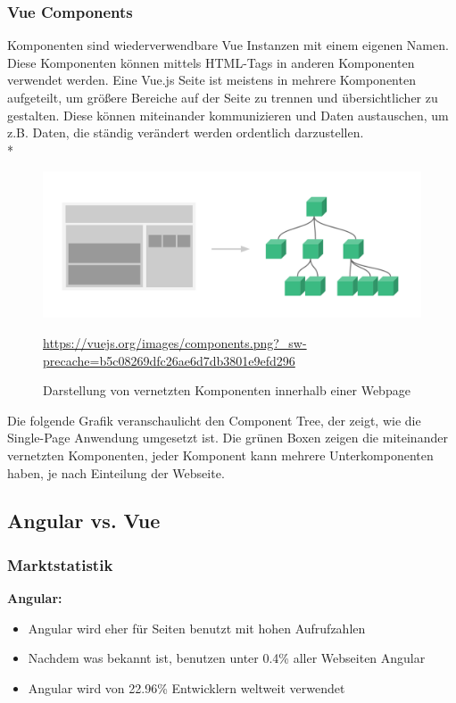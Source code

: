 \subsubsection{Vue Components}
Komponenten sind wiederverwendbare Vue Instanzen mit einem eigenen Namen. Diese Komponenten können mittels HTML-Tags in anderen Komponenten verwendet werden.
Eine Vue.js Seite ist meistens in mehrere Komponenten aufgeteilt, um größere Bereiche auf der Seite zu trennen und übersichtlicher zu gestalten. Diese können miteinander 
kommunizieren und Daten austauschen, um z.B. Daten, die ständig verändert werden ordentlich darzustellen.\cite{VueGuideComponents} \\*
\begin{figure}[htp]
    \centering
    \includegraphics[scale=0.3]{pics/NestedComponentsTree.png}
    \caption{Darstellung von vernetzten Komponenten innerhalb einer Webpage}
        \small \url{https://vuejs.org/images/components.png?_sw-precache=b5c08269dfc26ae6d7db3801e9efd296}
    \label{fig:impl:NestedComponentsTree}
\end{figure}
Die folgende Grafik veranschaulicht den Component Tree, der zeigt, wie die Single-Page Anwendung umgesetzt ist. 
Die grünen Boxen zeigen die miteinander vernetzten Komponenten, jeder Komponent kann mehrere Unterkomponenten haben, je nach Einteilung der Webseite.
\subsection{Angular vs. Vue}
\subsubsection{Marktstatistik}
\textbf{Angular:}
\begin{itemize}
    \item Angular wird eher für Seiten benutzt mit hohen Aufrufzahlen \cite{AngularUsage}
    \item Nachdem was bekannt ist, benutzen unter 0.4\% aller Webseiten Angular \cite{UsageJSLibs}   
    \item Angular wird von 22.96\% Entwicklern weltweit verwendet \cite{AngVsVueSIM}
\end{itemize}

